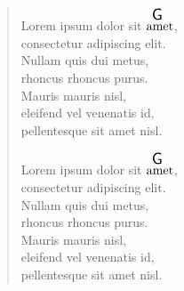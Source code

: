 \documentclass[twocolumn]{article}
\begin{document}
\begin{verse}
Lorem ipsum dolor sit $\overset{ \resizebox{0.3cm}{!}{\textsf{G}} }{\text{amet}}$, \\
consectetur adipiscing elit.\\
Nullam quis dui metus, \\
rhoncus rhoncus purus. \\
Mauris mauris nisl, \\
eleifend vel venenatis id, \\
pellentesque sit amet nisl.

Lorem ipsum dolor sit $\overset{ \resizebox{0.3cm}{!}{\textsf{G}} }{\text{amet}}$, \\
consectetur adipiscing elit.\\
Nullam quis dui metus, \\
rhoncus rhoncus purus. \\
Mauris mauris nisl, \\
eleifend vel venenatis id, \\
pellentesque sit amet nisl.

\end{verse}
\end{document}
